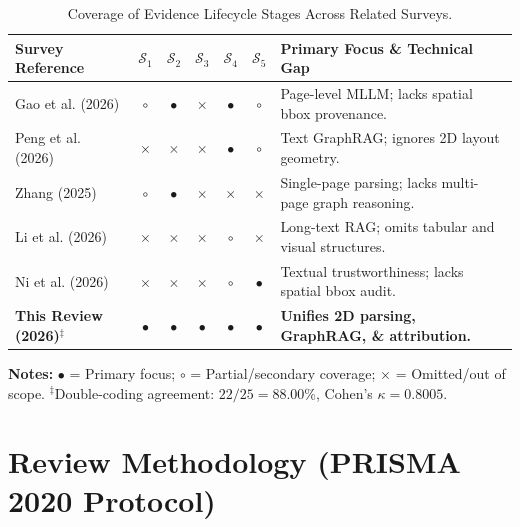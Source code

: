 \documentclass[conference,a4paper]{IEEEtran}
\begin{document}
\begin{table}[htbp]
\caption{Coverage of Evidence Lifecycle Stages Across Related Surveys.}
\centering
\scriptsize
\setlength{\tabcolsep}{1.2pt}
\begin{tabularx}{\columnwidth}{@{}p{2.3cm}ccccc>{\raggedright\arraybackslash}X@{}}
\toprule
\textbf{Survey Reference} & \textbf{$\mathcal{S}_1$} & \textbf{$\mathcal{S}_2$} & \textbf{$\mathcal{S}_3$} & \textbf{$\mathcal{S}_4$} & \textbf{$\mathcal{S}_5$} & \textbf{Primary Focus \& Technical Gap} \\
\midrule
Gao et al. (2026) \cite{gao2026} & $\circ$ & $\bullet$ & $\times$ & $\bullet$ & $\circ$ & Page-level MLLM; lacks spatial bbox provenance. \\
Peng et al. (2026) \cite{peng2025} & $\times$ & $\times$ & $\times$ & $\bullet$ & $\circ$ & Text GraphRAG; ignores 2D layout geometry. \\
Zhang (2025) \cite{zhang2025} & $\circ$ & $\bullet$ & $\times$ & $\times$ & $\times$ & Single-page parsing; lacks multi-page graph reasoning. \\
Li et al. (2026) \cite{li2025} & $\times$ & $\times$ & $\times$ & $\circ$ & $\times$ & Long-text RAG; omits tabular and visual structures. \\
Ni et al. (2026) \cite{ni2026trustworthy} & $\times$ & $\times$ & $\times$ & $\circ$ & $\bullet$ & Textual trustworthiness; lacks spatial bbox audit. \\
\textbf{This Review (2026)}$^\ddagger$ & $\bullet$ & $\bullet$ & $\bullet$ & $\bullet$ & $\bullet$ & \textbf{Unifies 2D parsing, GraphRAG, \& attribution.} \\
\bottomrule
\end{tabularx}
\vspace{1.5pt}
\begin{minipage}{\columnwidth}
{\scriptsize\raggedright \textbf{Notes:} $\bullet$ = Primary focus; $\circ$ = Partial/secondary coverage; $\times$ = Omitted/out of scope. $^\ddagger$Double-coding agreement: $22/25 = 88.00\%$, Cohen's $\kappa = 0.8005$.\par}
\end{minipage}
\label{tab:survey_comparison}
\end{table}

\section{Review Methodology (PRISMA 2020 Protocol)}
\end{document}
